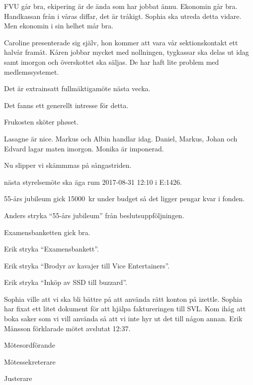 \documentclass[10pt]{article}
\def\mo{Erik Månsson}
\def\ms{Johan Karlberg}
\def\ji{Daniel Bakic}
\begin{document}
\begin{paragrafer}
\begin{paragrafer}
FVU går bra, ekipering är de ända som har jobbat ännu.
Ekonomin går bra. Handkassan från i våras diffar, det är tråkigt. Sophia ska utreda detta vidare. Men ekonomin i sin helhet mår bra.

Caroline presenterade sig själv, hon kommer att vara vår sektionskontakt ett halvår framåt. Kåren jobbar mycket med nollningen, tygkassar ska delas ut idag samt imorgon och överskottet ska säljas. De har haft lite problem med medlemssystemet.

Det är extrainsatt fullmäktigamöte nästa vecka.

\end{paragrafer}

Det fanns ett generellt intresse för detta.

\newpage
{}
Frukosten sköter phøset.

Lasagne är nice. Markus och Albin handlar idag. Daniel, Markus, Johan och Edvard lagar maten imorgon.
Monika är imponerad.

Nu slipper vi skämmmas på sångastriden.

{\Mba} nästa styrelsemöte ska äga rum 2017-08-31 12:10 i E:1426.

55-års jubileum gick \SI{15000}{kr} under budget så det ligger pengar kvar i fonden.

Anders \ypa stryka ``55-års jubileum'' från beslutsuppföljningen.

\Mbaby

Examensbanketten gick bra.

Erik \ypa stryka ``Examensbankett''.

\Mbaby

Erik \ypa stryka ``Brodyr av kavajer till Vice Entertainers''.

\Mbaby

Erik \ypa stryka ``Inköp av SSD till buzzard''.

\Mbaby
{}
Sophia ville att vi ska bli bättre på att använda rätt konton på izettle.
Sophia har fixat ett litet dokument för att hjälpa faktureringen till SVL.
Kom ihåg att boka saker som vi vill använda så att vi inte hyr ut det till någon annan.
{\mo} förklarade mötet avslutat 12:37.
\newpage
\end{paragrafer}

\hidesignfoot
\begin{signatures}{3}
\signature{\mo}{Mötesordförande}
\signature{\ms}{Mötessekreterare}
\signature{\ji}{Justerare}
\end{signatures}
\end{document}
